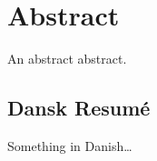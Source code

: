\begingroup
	\let\clearpage\relax
	\let\cleardoublepage\relax
	\let\cleardoublepage\relax

	\chapter*{Abstract}
		An abstract abstract.

		\vfill

		\begin{otherlanguage}{danish}
			\chapter*{Dansk Resum\'e}
			Something in Danish\dots
		\end{otherlanguage}

\endgroup

	\vfill
